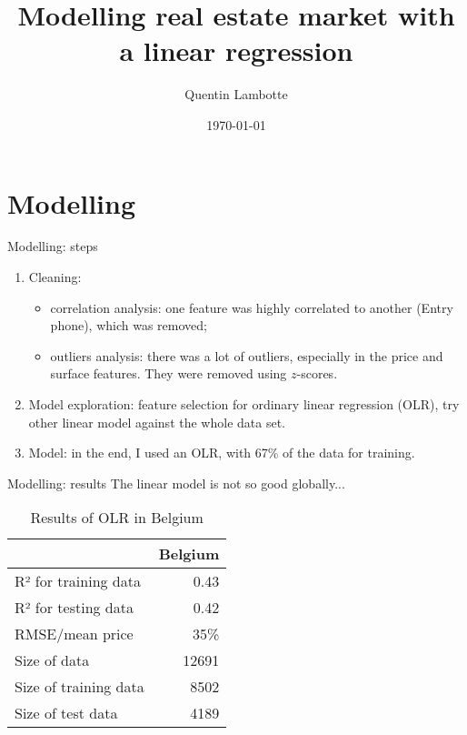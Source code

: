 \documentclass[handout,10pt,hyperref={urlcolor=orange}]{beamer}
\title{Modelling real estate market with a linear regression}
\date{\today}
\author{Quentin Lambotte}
\begin{document}
\maketitle


\section{Modelling}

\begin{frame}{Modelling: steps}
  \begin{enumerate}
  \item Cleaning:
    \begin{itemize}
    \item correlation analysis: one feature was highly correlated to another (Entry phone), which was removed;
    \item outliers analysis: there was a lot of outliers, especially in the price and surface features. They were removed using $z$-scores.
    \end{itemize}
  \item Model exploration: feature selection for ordinary linear regression (OLR), try other linear model against the whole data set.
  \item Model: in the end, I used an OLR, with 67\% of the data for training.
  \end{enumerate}
\end{frame}
\begin{frame}{Modelling: results}
  The linear model is not so good globally...
  \begin{table}
    \centering
    \begin{tabular}{lr}
      \toprule
      {} &        Belgium \\
      \midrule
      R² for training data  &           0.43 \\
      R² for testing data   &           0.42 \\
      RMSE/mean price  & 35\% \\
      Size of data          &       12691 \\
      Size of training data &        8502 \\
      Size of test data     &        4189 \\
      \bottomrule
    \end{tabular}
    \caption{Results of OLR in Belgium}
  \end{table}

\end{frame}
\end{document}
